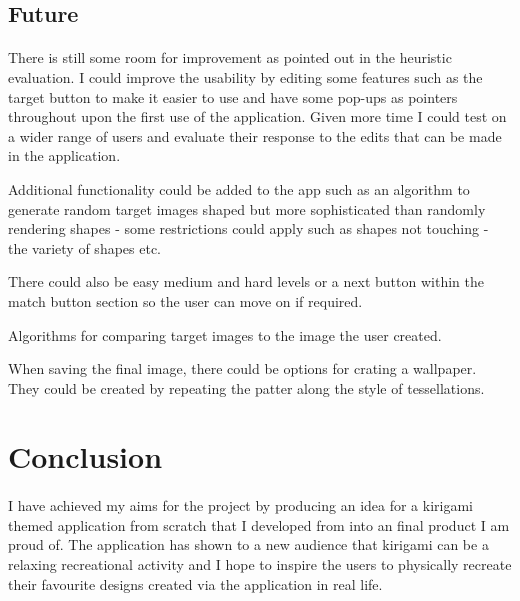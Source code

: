 \documentclass[11pt]{article}
\begin{document}
    \subsection{Future}
        
                \paragraph{}
                
                There is still some room for improvement as pointed out in the heuristic evaluation. I could improve the usability by editing some features such as the target button to make it easier to use and have some pop-ups as pointers throughout upon the first use of the application. Given more time I could test on a wider range of users and evaluate their response to the edits that can be made in the application. 
                
                Additional functionality could be added to the app such as an algorithm to generate random target images shaped but more sophisticated than randomly rendering shapes - some restrictions could apply such as shapes not touching - the variety of shapes etc.
                
                There could also be easy medium and hard levels or a next button within the match button section so the user can move on if required. 
                
                Algorithms for comparing target images to the image the user created.

                When saving the final image, there could be options for crating a wallpaper. They could be created by repeating the patter
                along the style of tessellations. 

\newpage
\section{Conclusion}
        
            \paragraph{}
            
            
            I have achieved my aims for the project by producing an idea for a kirigami themed application from scratch that I developed from into an final product I am proud of. The application has shown to a new audience that kirigami can be a relaxing recreational activity and I hope to inspire the users to physically recreate their favourite designs created via the application in real life.
\end{document}
